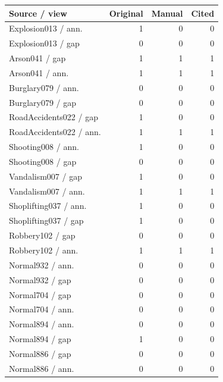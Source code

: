 \begin{longtable}{lrrr}\toprule
Source / view & Original & Manual & Cited\\\midrule\endhead
Explosion013 / ann. & 1 & 0 & 0\\
Explosion013 / gap & 0 & 0 & 0\\
Arson041 / gap & 1 & 1 & 1\\
Arson041 / ann. & 1 & 1 & 1\\
Burglary079 / ann. & 0 & 0 & 0\\
Burglary079 / gap & 0 & 0 & 0\\
RoadAccidents022 / gap & 1 & 0 & 0\\
RoadAccidents022 / ann. & 1 & 1 & 1\\
Shooting008 / ann. & 1 & 0 & 0\\
Shooting008 / gap & 0 & 0 & 0\\
Vandalism007 / gap & 1 & 0 & 0\\
Vandalism007 / ann. & 1 & 1 & 1\\
Shoplifting037 / ann. & 1 & 0 & 0\\
Shoplifting037 / gap & 1 & 0 & 0\\
Robbery102 / gap & 0 & 0 & 0\\
Robbery102 / ann. & 1 & 1 & 1\\
Normal932 / ann. & 0 & 0 & 0\\
Normal932 / gap & 0 & 0 & 0\\
Normal704 / gap & 0 & 0 & 0\\
Normal704 / ann. & 0 & 0 & 0\\
Normal894 / ann. & 0 & 0 & 0\\
Normal894 / gap & 1 & 0 & 0\\
Normal886 / gap & 0 & 0 & 0\\
Normal886 / ann. & 0 & 0 & 0\\
\bottomrule\end{longtable}
